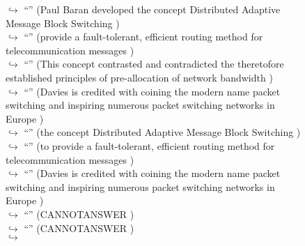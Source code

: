\documentclass[11pt,a4paper, onecolumn]{article}
\begin{document}
\begin{figure}[t] \small \begin{tcolorbox}[boxsep=0pt,left=5pt,right=0pt,top=2pt,colback = yellow!5] \begin{dialogue}
 \small 
\colorbox{pink!25}{$\hookrightarrow$}
{ ``'' (Paul Baran developed the concept Distributed Adaptive Message Block Switching ) }
\\
\colorbox{pink!25}{$\hookrightarrow$}
{ ``'' (provide a fault-tolerant, efficient routing method for telecommunication messages ) }
\\
\colorbox{pink!25}{$\hookrightarrow$}
{ ``'' (This concept contrasted and contradicted the theretofore established principles of pre-allocation of network bandwidth ) }
\\
\colorbox{pink!25}{$\hookrightarrow$}
{ ``'' (Davies is credited with coining the modern name packet switching and inspiring numerous packet switching networks in Europe ) }
\\
\colorbox{pink!25}{$\hookrightarrow$}
{ ``'' (the concept Distributed Adaptive Message Block Switching ) }
\\
\colorbox{pink!25}{$\hookrightarrow$}
{ ``'' (to provide a fault-tolerant, efficient routing method for telecommunication messages ) }
\\
\colorbox{pink!25}{$\hookrightarrow$}
{ ``'' (Davies is credited with coining the modern name packet switching and inspiring numerous packet switching networks in Europe ) }
\\
\colorbox{pink!25}{$\hookrightarrow$}
{ ``'' (CANNOTANSWER ) }
\\
\colorbox{pink!25}{$\hookrightarrow$}
{ ``'' (CANNOTANSWER ) }
\\
\colorbox{pink!25}{$\hookrightarrow$}

\end{dialogue}
\end{tcolorbox}
\end{figure}
\end{document}
